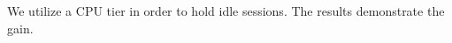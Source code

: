 \documentclass{article}
\begin{document}
We utilize a CPU tier in order to hold idle sessions.
The results demonstrate the gain.
\end{document}
